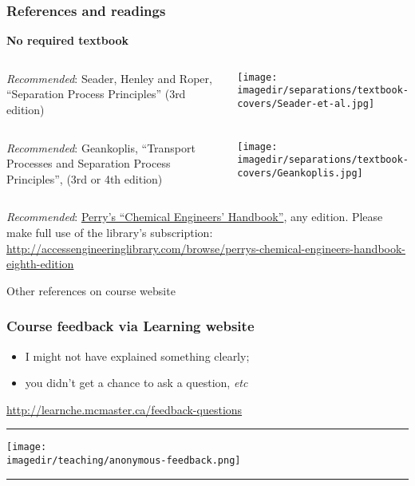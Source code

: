 \begin{frame}\frametitle{References and readings}

	\textbf{No required textbook}
	\begin{columns}[t]
			\emph{Recommended}: Seader, Henley and Roper, ``Separation Process Principles'' (3rd edition)
			\vspace{-1cm}
			\begin{center}
				\texttt{[image: \\imagedir/separations/textbook-covers/Seader-et-al.jpg]}
			\end{center}
	\end{columns}

	\vspace{12pt}
	\begin{columns}[t]
			\emph{Recommended}: Geankoplis, ``Transport Processes and Separation Process Principles'', (3rd or 4th edition)
			\vspace{-1cm}
			\begin{center}
				\texttt{[image: \\imagedir/separations/textbook-covers/Geankoplis.jpg]}
			\end{center}
	\end{columns}

	\vspace{12pt}
	\emph{Recommended}: \href{http://accessengineeringlibrary.com/browse/perrys-chemical-engineers-handbook-eighth-edition}{Perry's ``Chemical Engineers' Handbook''}, any edition. Please make full use of the library's subscription: \\
	\href{http://accessengineeringlibrary.com/browse/perrys-chemical-engineers-handbook-eighth-edition}{\tiny http://accessengineeringlibrary.com/browse/perrys-chemical-engineers-handbook-eighth-edition}

	\vspace{24pt}
	Other references on course website

\end{frame}

\begin{frame}\frametitle{Course feedback via Learning website}
	\begin{itemize}
		\item	I might not have explained something clearly;
		\item	you didn't get a chance to ask a question, \emph{etc}
	\end{itemize}
	\href{http://learnche.mcmaster.ca/feedback-questions}{http://learnche.mcmaster.ca/feedback-questions}
	\vspace{12pt}
	\hrule
	\begin{center}
		\texttt{[image: \\imagedir/teaching/anonymous-feedback.png]}
	\end{center}
	\hrule
\end{frame}


